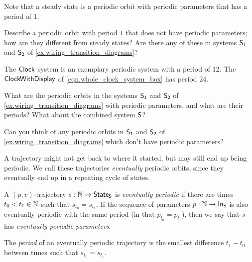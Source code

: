 \documentclass[DynamicalBook]{subfiles}
\begin{document}
{\begin{remark}
  Note that a steady state is a periodic orbit with periodic parameters that has
  a period of $1$. 
\end{remark}

\begin{exercise}
Describe a periodic orbit with period $1$ that does not have periodic
parameters; how are they different from steady states? Are there any of these in systems $\mathsf{S_1}$ and $\mathsf{S_2}$ of \cref{ex.wiring_transition_diagrams}?
\end{exercise}

\begin{example}
  The $\mathsf{Clock}$ system is an exemplary periodic system with a period of 12.
  The $\mathsf{ClockWithDisplay}$ of \cref{eqn.whole_clock_system_box} has period 24.
\end{example}

\begin{exercise}\label{ex.wiring_transition_diagrams_periodic_orbits}
  What are the periodic orbits in the systems $\mathsf{S_1}$ and $\mathsf{S_2}$ of
  \cref{ex.wiring_transition_diagrams} with periodic parameters, and what are their periods? What about
  the combined system $\mathsf{S}$?
\end{exercise}

\begin{exercise}\label{ex.wiring_transition_diagrams_periodic_parameters}
  Can you think of any periodic orbits in $\mathsf{S_1}$ and $\mathsf{S_2}$ of
  \cref{ex.wiring_transition_diagrams} which
  don't have periodic parameters? 
\end{exercise}

A trajectory might not get back to where it started, but may still end up being
periodic. We call these trajectories \emph{eventually} periodic orbits, since
they eventually end up in a repeating cycle of states.

\begin{definition} \label{def.eventually_periodic_orbit_discrete}
A $(p, v)$-trajectory $s : \mathbb{N} \to
  \mathsf{State}_{\mathsf{S}}$ is \emph{eventually periodic} if there are times $t_0 < t_1 \in
  \mathbb{N}$ such that $s_{t_0} = s_{t_1}$. If the sequence of
  parameters $p : \mathbb{N} \to \mathsf{In}_{\mathsf{S}}$ is also eventually periodic with the same period (in that $p_{t_0} = p_{t_1}$), then we say that $s$ has \emph{eventually periodic parameters}.

The \emph{period} of an eventually periodic trajectory is
  the smallest difference $t_1 - t_0$ between times such that $s_{t_0} = s_{t_1}$.
\end{definition}

}
\end{document}
